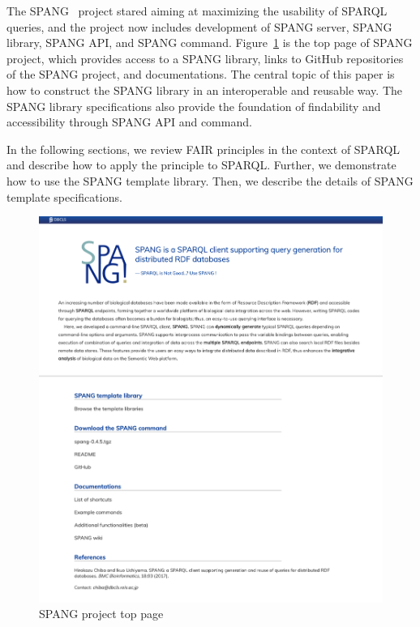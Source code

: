 \documentclass[runningheads]{llncs}
\begin{document}
The SPANG~\cite{spang} project stared aiming at maximizing the usability of SPARQL queries, and the project now includes development of SPANG server, SPANG library, SPANG API, and SPANG command. 
Figure~\ref{fig:spang_top} is the top page of SPANG project, which provides access to a SPANG library, links to GitHub repositories of the SPANG project, and documentations. 
The central topic of this paper is how to construct the SPANG library in an interoperable and reusable way. 
The SPANG library specifications also provide the foundation of findability and accessibility through SPANG API and command.

In the following sections, we review FAIR principles in the context of SPARQL and describe how to apply the principle to SPARQL.
Further, we demonstrate how to use the SPANG template library.
Then, we describe the details of SPANG template specifications.


\begin{figure}
\center
\includegraphics[width=1.0\textwidth]{spang_top.png}
\caption{SPANG project top page}
\label{fig:spang_top}
\end{figure}
\end{document}

